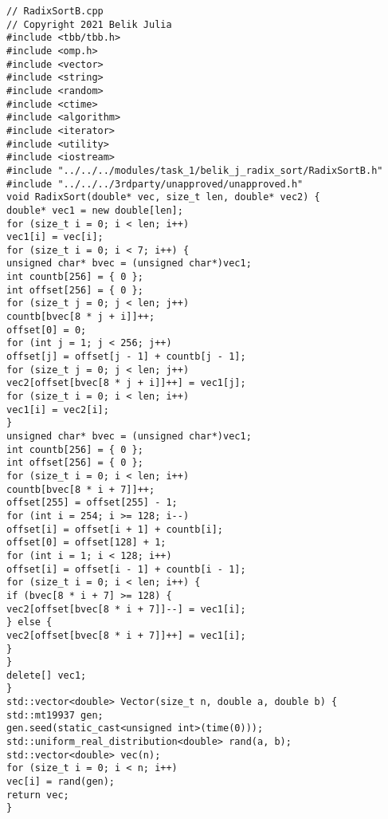 \documentclass{report}
\begin{document}
\begin{lstlisting}
// RadixSortB.cpp
// Copyright 2021 Belik Julia
#include <tbb/tbb.h>
#include <omp.h>
#include <vector>
#include <string>
#include <random>
#include <ctime>
#include <algorithm>
#include <iterator>
#include <utility>
#include <iostream>
#include "../../../modules/task_1/belik_j_radix_sort/RadixSortB.h"
#include "../../../3rdparty/unapproved/unapproved.h"
void RadixSort(double* vec, size_t len, double* vec2) {
double* vec1 = new double[len];
for (size_t i = 0; i < len; i++)
vec1[i] = vec[i];
for (size_t i = 0; i < 7; i++) {
unsigned char* bvec = (unsigned char*)vec1;
int countb[256] = { 0 };
int offset[256] = { 0 };
for (size_t j = 0; j < len; j++)
countb[bvec[8 * j + i]]++;
offset[0] = 0;
for (int j = 1; j < 256; j++)
offset[j] = offset[j - 1] + countb[j - 1];
for (size_t j = 0; j < len; j++)
vec2[offset[bvec[8 * j + i]]++] = vec1[j];
for (size_t i = 0; i < len; i++)
vec1[i] = vec2[i];
}
unsigned char* bvec = (unsigned char*)vec1;
int countb[256] = { 0 };
int offset[256] = { 0 };
for (size_t i = 0; i < len; i++)
countb[bvec[8 * i + 7]]++;
offset[255] = offset[255] - 1;
for (int i = 254; i >= 128; i--)
offset[i] = offset[i + 1] + countb[i];
offset[0] = offset[128] + 1;
for (int i = 1; i < 128; i++)
offset[i] = offset[i - 1] + countb[i - 1];
for (size_t i = 0; i < len; i++) {
if (bvec[8 * i + 7] >= 128) {
vec2[offset[bvec[8 * i + 7]]--] = vec1[i];
} else {
vec2[offset[bvec[8 * i + 7]]++] = vec1[i];
}
}
delete[] vec1;
}
std::vector<double> Vector(size_t n, double a, double b) {
std::mt19937 gen;
gen.seed(static_cast<unsigned int>(time(0)));
std::uniform_real_distribution<double> rand(a, b);
std::vector<double> vec(n);
for (size_t i = 0; i < n; i++)
vec[i] = rand(gen);
return vec;
}


\end{lstlisting}
\end{document}
